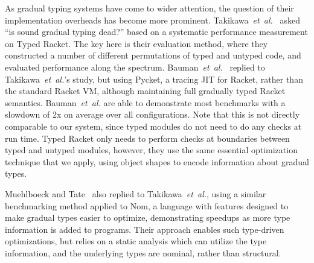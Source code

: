 As gradual typing systems have come to wider attention, the question of their
implementation overheads has become more prominent.  
Takikawa~\textit{et~al.}~\cite{Takikawa2016} asked ``is sound gradual typing
dead?'' based on a systematic performance measurement on Typed Racket.
The key here is their evaluation method, where they constructed a
number of different permutations of typed and untyped code, and
evaluated performance along the spectrum.
Bauman~\textit{et~al.}~\cite{Bauman2017} replied to Takikawa~\textit{et~al.}'s study, but
using Pycket\citep{Pycket2015}, a tracing JIT for Racket, rather
than the standard Racket VM, although maintaining full gradually typed
Racket semantics. Bauman~\textit{et~al.} are able to demonstrate most benchmarks
with a slowdown of 2x on average over all configurations.
Note that this is not directly comparable to our system,
since typed modules do not need to do any checks at run time.
Typed Racket only needs to perform checks at boundaries between typed and untyped modules,
however, they use the same essential optimization technique that we apply,
using object shapes to encode information about gradual types.


Muehlboeck and Tate~\cite{Muehlboeck2017} also replied to
Takikawa~\textit{et~al.}, using a similar benchmarking method applied
to Nom, a language with features designed to make gradual types easier
to optimize, demonstrating speedups as more type information is added
to programs.  Their approach enables such type-driven optimizations,
but relies on a static analysis which can utilize the type
information, and the underlying types are nominal, rather than
structural.




